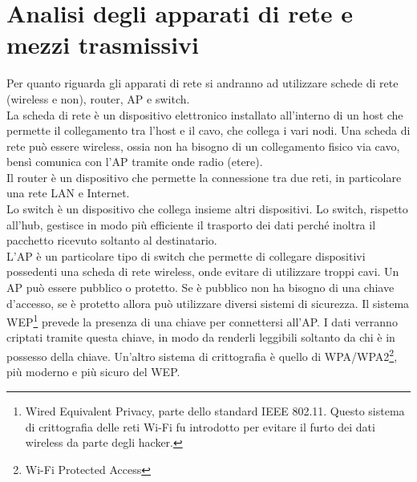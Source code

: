 \section{Analisi degli apparati di rete e mezzi trasmissivi}
Per quanto riguarda gli apparati di rete si andranno ad utilizzare schede di rete (wireless e non), router, AP e switch.\\ \hspace{24pt}La scheda di rete è un dispositivo elettronico installato all'interno di un host che permette il collegamento tra l'host e il cavo, che collega i vari nodi. Una scheda di rete può essere wireless, ossia non ha bisogno di un collegamento fisico via cavo, bensì comunica con l'AP tramite onde radio (etere).\\
\hspace{24pt}Il router è un dispositivo che permette la connessione tra due reti, in particolare una rete LAN e Internet.\\
\hspace{24pt}Lo switch è un dispositivo che collega insieme altri dispositivi. Lo switch, rispetto all'hub, gestisce in modo più efficiente il trasporto dei dati perché inoltra il pacchetto ricevuto soltanto al destinatario.\\
\hspace{24pt}L'AP è un particolare tipo di switch che permette di collegare dispositivi possedenti una scheda di rete wireless, onde evitare di utilizzare troppi cavi. Un AP può essere pubblico o protetto. Se è pubblico non ha bisogno di una chiave d'accesso, se è protetto allora può utilizzare diversi sistemi di sicurezza. Il sistema WEP\footnote{Wired Equivalent Privacy, parte dello standard IEEE 802.11. Questo sistema di crittografia delle reti Wi-Fi fu introdotto per evitare il furto dei dati wireless da parte degli hacker.} prevede la presenza di una chiave per connettersi all'AP. I dati verranno criptati tramite questa chiave, in modo da renderli leggibili soltanto da chi è in possesso della chiave. Un'altro sistema di crittografia è quello di WPA/WPA2\footnote{Wi-Fi Protected Access}, più moderno e più sicuro del WEP.